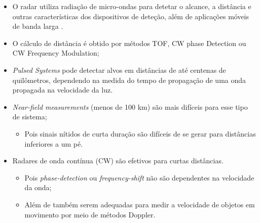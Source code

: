 \documentclass[xcolor=dvipsnames, aspectratio=169]{beamer}
\begin{document}
\begin{frame}
\begin{itemize}
    \newpage
    \item O radar utiliza radiação de micro-ondas para detetar o alcance, a distância e outras características dos dispositivos de deteção, além de aplicações móveis de banda larga \cite{Agarwal_2021}.
    \item O cálculo de distância é obtido por métodos TOF, CW phase Detection ou CW Frequency Modulation;
    \item \textit{Pulsed Systems} pode detectar alvos em distâncias de até centenas de quilômetros, dependendo na medida do tempo de propagação de uma onda propagada na velocidade da luz.
    \item \textit{Near-field measurements} (menos de 100 km) são mais difíceis para esse tipo de sistema;
    \begin{itemize}
        \item Pois sinais nítidos de curta duração são difíceis de se gerar para distâncias inferiores a um pé.
    \end{itemize} 
    \item Radares de onda contínua (CW) são efetivos para curtas distâncias.
    \begin{itemize}
        \item Pois \textit{phase-detection} ou \textit{frequency-shift} não são dependentes na velocidade da onda;
        \item Além de também serem adequadas para medir a velocidade de objetos em movimento por meio de métodos Doppler.
    \end{itemize}
	\end{itemize}
	
\end{frame}
\end{document}
